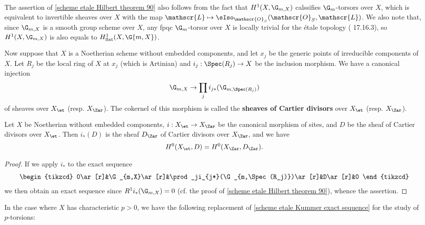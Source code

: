 \begin{remark}
The assertion of \cref{scheme etale Hilbert theorem 90} also follows from the fact that $H^1(X,\G_{m,X})$ calssifies $\G_m$-torsors over $X$, which is equivalent to invertible sheaves over $X$ with the map $\mathscr{L}\mapsto\sIso_{\mathscr{O}_S}(\mathscr{O}_S,\mathscr{L})$. We also note that, since $\G_{m,X}$ is a smooth group scheme over $X$, any fpqc $\G_{m}$-torsor over $X$ is locally trivial for the \'etale topology (\cite{EGA4-4} 17.16.3), so $H^1(X,\G_{m,X})$ is also equals to $H^1_{\mathrm{flat}}(X,\G{m,X})$.
\end{remark}

Now suppose that $X$ is a Noetherian scheme without embedded components, and let $x_j$ be the generic points of irreducible components of $X$. Let $R_j$ be the local ring of $X$ at $x_j$ (which is Artinian) and $i_j:\Spec(R_j)\to X$ be the inclusion morphism. We have a canonical injection
\[\G_{m,X}\to\prod_ji_{j*}(\G_{m,\Spec(R_j)})\]
of sheaves over $X_\et$ (resp. $X_\Zar$). The cokernel of this morphism is called the \textbf{sheaves of Cartier divisors} over $X_\et$ (resp. $X_\Zar$).

\begin{corollary}\label{scheme Noe etale Cartier divisor sheaf direct image of Zar}
Let $X$ be Noetherian without embedded components, $i:X_\et\to X_\Zar$ be the canonical morphism of sites, and $D$ be the sheaf of Cartier divisors over $X_\et$. Then $i_*(D)$ is the sheaf $D_\Zar$ of Cartier divisors over $X_\Zar$, and we have
\[H^0(X_\et,D)=H^0(X_\Zar,D_\Zar).\]
\end{corollary}
\begin{proof}
If we apply $i_*$ to the exact sequence
\[\begin{tikzcd}
0\ar[r]&\G_{m,X}\ar[r]&\prod_ji_{j*}(\G_{m,\Spec(R_j)})\ar[r]&D\ar[r]&0
\end{tikzcd}\]
we then obtain an exact sequence since $R^1i_*(\G_{m,X})=0$ (cf. the proof of \cref{scheme etale Hilbert theorem 90}), whence the assertion.
\end{proof}

In the case where $X$ has characteristic $p>0$, we have the following replacement of \cref{scheme etale Kummer exact sequence} for the study of $p$-torsions:

